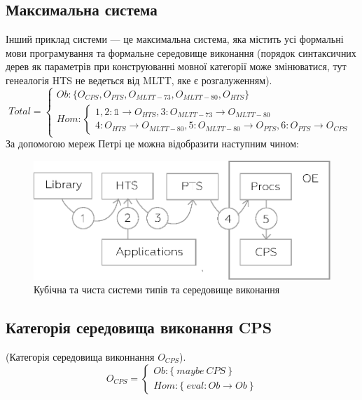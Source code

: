 \subsection{Максимальна система}
Інший приклад системи --- це максимальна система, яка містить усі формальні
мови програмування та формальне середовище виконання (порядок синтаксичних дерев
як параметрів при конструюванні мовної категорії може змінюватися, тут
генеалогія HTS не ведеться від MLTT, яке є розгалуженням).
\begin{equation}
Total =
\begin{cases}
Ob: \{ O_{CPS}, O_{PTS}, O_{MLTT-73}, O_{MLTT-80}, O_{HTS} \} \\
Hom: \begin{cases}
1,2: \mathbb{1} \rightarrow O_{HTS}, 3: O_{MLTT-73} \rightarrow O_{MLTT-80} \\
4: O_{HTS} \rightarrow O_{MLTT-80}, 5: O_{MLTT-80} \rightarrow O_{PTS}, 6: O_{PTS} \rightarrow O_{CPS}
\end{cases}
\end{cases}
\end{equation}
За допомогою мереж Петрі це можна відобразити наступним чином:
\begin{center}
\begin{figure}[ht]
  \centerline{\includegraphics[scale=0.6]{higher.eps}}
  \caption{Кубічна та чиста системи типів та середовище виконання}
\end{figure}
\end{center}


\newpage
\subsection{Категорія середовища виконання CPS}
\begin{definition} (Категорія середовища виконнання $O_{CPS}$).
$$
O_{CPS} =
\begin{cases}
Ob: \{\ maybe\ CPS\ \} \\
Hom: \{\ eval: Ob \rightarrow Ob\ \}
\end{cases}
$$
\end{definition}

